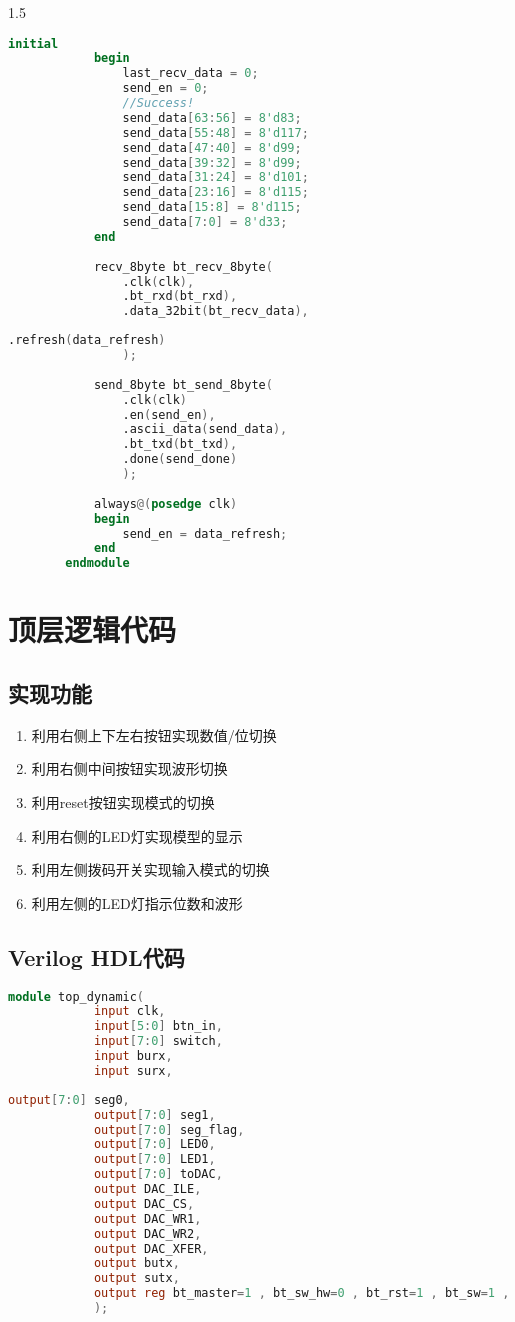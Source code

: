 {\begin{spacing}{1.5}
\begin{lstlisting}[language=Verilog]
			initial 
			begin
				last_recv_data = 0;
				send_en = 0;
				//Success!
				send_data[63:56] = 8'd83;
				send_data[55:48] = 8'd117;
				send_data[47:40] = 8'd99;
				send_data[39:32] = 8'd99;
				send_data[31:24] = 8'd101;
				send_data[23:16] = 8'd115;
				send_data[15:8] = 8'd115;
				send_data[7:0] = 8'd33;
			end
		
			recv_8byte bt_recv_8byte(
				.clk(clk),
				.bt_rxd(bt_rxd),
				.data_32bit(bt_recv_data),
		\end{lstlisting}
		\begin{lstlisting}[language=Verilog]
				.refresh(data_refresh)
				);
		
			send_8byte bt_send_8byte(
				.clk(clk)
				.en(send_en),
				.ascii_data(send_data),
				.bt_txd(bt_txd),
				.done(send_done)
				);
		
			always@(posedge clk)
			begin
				send_en = data_refresh;
			end
		endmodule
		\end{lstlisting}
	\section{顶层逻辑代码}
		\subsection{实现功能}
		\begin{enumerate}
			\item 利用右侧上下左右按钮实现数值/位切换
			\item 利用右侧中间按钮实现波形切换
			\item 利用reset按钮实现模式的切换
			\item 利用右侧的LED灯实现模型的显示
			\item 利用左侧拨码开关实现输入模式的切换
			\item 利用左侧的LED灯指示位数和波形
		\end{enumerate}
		\subsection{Verilog HDL代码}
		\begin{lstlisting}[language=Verilog]
		module top_dynamic(
			input clk,
			input[5:0] btn_in,
			input[7:0] switch,
			input burx,
			input surx,
		\end{lstlisting}
		\begin{lstlisting}[language=Verilog]
			output[7:0] seg0,
			output[7:0] seg1,
			output[7:0] seg_flag,
			output[7:0] LED0,
			output[7:0] LED1,
			output[7:0] toDAC,
			output DAC_ILE,
			output DAC_CS,
			output DAC_WR1,
			output DAC_WR2,
			output DAC_XFER,
			output butx,
			output sutx,
			output reg bt_master=1 , bt_sw_hw=0 , bt_rst=1 , bt_sw=1 , bt_pw=1
			);
		

\end{lstlisting}
\end{spacing}}
